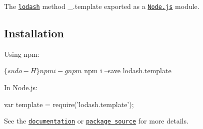 The \href{https://lodash.com/}{\tt lodash} method {\ttfamily \+\_\+.\+template} exported as a \href{https://nodejs.org/}{\tt Node.\+js} module.

\subsection*{Installation}

Using npm\+: 
\begin{DoxyCode}
$ \{sudo -H\} npm i -g npm
$ npm i --save lodash.template
\end{DoxyCode}


In Node.\+js\+: 
\begin{DoxyCode}
var template = require('lodash.template');
\end{DoxyCode}


See the \href{https://lodash.com/docs#template}{\tt documentation} or \href{https://github.com/lodash/lodash/blob/4.4.0-npm-packages/lodash.template}{\tt package source} for more details. 